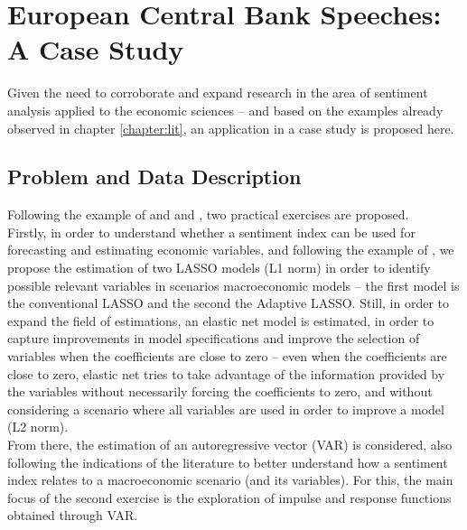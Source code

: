 \chapter{\textbf{European Central Bank Speeches: A Case Study}}

Given the need to corroborate and expand research in the area of sentiment analysis applied to the economic sciences -- and based on the examples already observed in chapter \ref{chapter:lit}, an application in a case study is proposed here.\\



\section{Problem and Data Description}

Following the example of \cite{shapiro2020measuring} and \cite{barsky2012information} and \cite{shapiro2020measuring}, two practical exercises are proposed.\\

Firstly, in order to understand whether a sentiment index can be used for forecasting and estimating economic variables, and following the example of \cite{shapiro2020measuring}, we propose the estimation of two LASSO models (L1 norm) in order to identify possible relevant variables in scenarios macroeconomic models -- the first model is the conventional LASSO and the second the Adaptive LASSO. Still, in order to expand the field of estimations, an elastic net model is estimated, in order to capture improvements in model specifications and improve the selection of variables when the coefficients are close to zero -- even when the coefficients are close to zero, elastic net tries to take advantage of the information provided by the variables without necessarily forcing the coefficients to zero, and without considering a scenario where all variables are used in order to improve a model (L2 norm).\\

From there, the estimation of an autoregressive vector (VAR) is considered, also following the indications of the literature \citep{shapiro2020measuring, barsky2012information} to better understand how a sentiment index relates to a macroeconomic scenario (and its variables). For this, the main focus of the second exercise is the exploration of impulse and response functions obtained through VAR.

